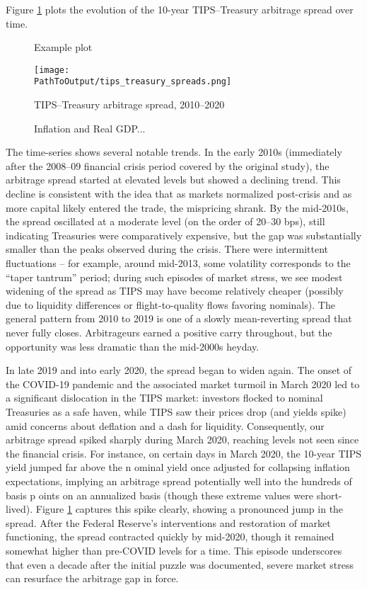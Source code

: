 \documentclass[12pt]{article}
\begin{document}
Figure \ref{fig:spreads} plots the evolution of the 10-year TIPS–Treasury arbitrage spread over time. 
\begin{figure}
  \centering
  \caption{Example plot}
    \centering
    \texttt{[image: \\PathToOutput/tips\_treasury\_spreads.png]}
    \caption{TIPS–Treasury arbitrage spread, 2010–2020}
  \caption*{
    Inflation and Real GDP...
    }
  \label{fig:spreads}
  \end{figure}
  The time-series shows several notable trends. In the early 2010s (immediately after the 2008–09 financial crisis period covered by the original 
  study), the arbitrage spread started at elevated levels but showed a declining trend. This decline is consistent with the idea that as markets 
  normalized post-crisis and as more capital likely entered the trade, the mispricing shrank. By the mid-2010s, the spread oscillated at a moderate 
  level (on the order of 20–30 bps), still indicating Treasuries were comparatively expensive, but the gap was substantially smaller than the peaks 
  observed during the crisis. There were intermittent fluctuations – for example, around mid-2013, some volatility corresponds to the “taper tantrum” 
  period; during such episodes of market stress, we see modest widening of the spread as TIPS may have become relatively cheaper (possibly due to 
  liquidity differences or flight-to-quality flows favoring nominals). The general pattern from 2010 to 2019 is one of a slowly mean-reverting spread 
  that never fully closes. Arbitrageurs earned a positive carry throughout, but the opportunity was less dramatic than the mid-2000s heyday.

In late 2019 and into early 2020, the spread began to widen again. The onset of the COVID-19 pandemic and the associated market turmoil in March 
2020 led to a significant dislocation in the TIPS market: investors flocked to nominal Treasuries as a safe haven, while TIPS saw their prices drop 
(and yields spike) amid concerns about deflation and a dash for liquidity. Consequently, our arbitrage spread spiked sharply during March 2020,
 reaching levels not seen since the financial crisis. For instance, on certain days in March 2020, the 10-year TIPS yield jumped far above the n
 ominal yield once adjusted for collapsing inflation expectations, implying an arbitrage spread potentially well into the hundreds of basis p
 oints on an annualized basis (though these extreme values were short-lived). Figure \ref{fig:spreads} captures this spike clearly, showing a 
 pronounced jump in the spread. After the Federal Reserve’s interventions and restoration of market functioning, the spread contracted quickly by 
 mid-2020, though it remained somewhat higher than pre-COVID levels for a time. This episode underscores that even a decade after the initial 
 puzzle was documented, severe market stress can resurface the arbitrage gap in force.
\end{document}
